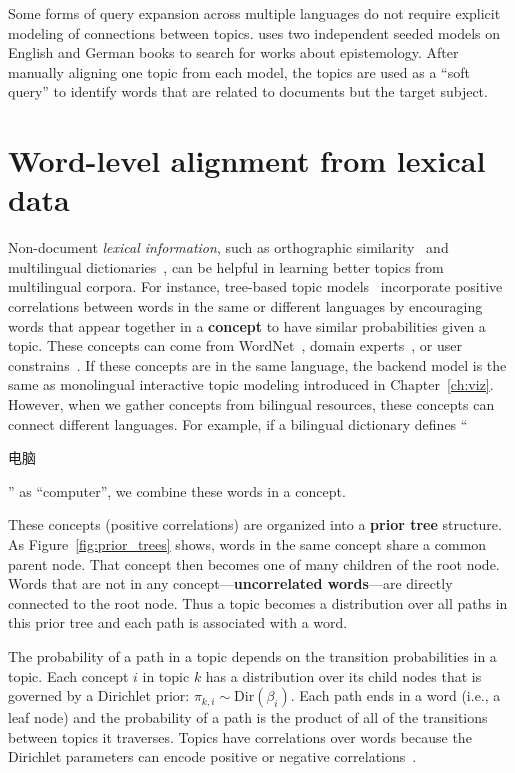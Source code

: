 Some forms of query expansion across multiple languages do not require explicit modeling of connections between topics.
\cite{erlin2017topic} uses two independent seeded models on English and German books to search for works about epistemology.
After manually aligning one topic from each model, the topics are used as a ``soft query'' to identify words that are related to documents but the target subject.

\section{Word-level alignment from lexical data}

Non-document \emph{lexical information}, such as orthographic
similarity~\citep{boyd-graber-09} and multilingual
dictionaries~\citep{boyd-graber-10}, can be helpful in learning
better topics from multilingual corpora. For instance, tree-based
topic models~\citep[\tlda{}]{boyd-graber-07,andrzejewski-09,hu-14:itm}
incorporate positive correlations between words in the same or
different languages by encouraging words that appear together in a
{\bf concept} to have similar probabilities given a topic. These
concepts can come from WordNet~\citep{boyd-graber-10}, domain
experts~\citep{andrzejewski-09}, or user
constrains~\citep{hu-14:itm}. If these concepts are in the same
language, the backend model is the same as monolingual interactive topic modeling
introduced in Chapter~\ref{ch:viz}. However, when we gather concepts
from bilingual resources, these concepts can connect different
languages. For example, if a bilingual dictionary defines
``\begin{CJK*}{UTF8}{gbsn}电脑\end{CJK*}'' as ``computer'', we combine
  these words in a concept.

These concepts (positive correlations) are organized into a {\bf prior
  tree} structure. As Figure~\ref{fig:prior_trees} shows, words in the
same concept share a common parent node. That concept then becomes
one of many children of the root node.  Words that are not in any
concept---{\bf uncorrelated words}---are directly connected to the
root node. Thus a topic becomes a distribution over all paths in this
prior tree and each path is associated with a word.

The probability of a path in a topic depends on the transition
probabilities in a topic.  Each concept $i$ in topic $k$ has a
distribution over its child nodes that is governed by a Dirichlet prior:
$\pi_{k,i} \sim \text{Dir}(\beta_{i})$.  Each path ends in a word
(i.e., a leaf node) and the probability of a path is the product of
all of the transitions between topics it traverses. Topics have
correlations over words because the Dirichlet parameters can encode
positive or negative correlations~\citep{andrzejewski-09}.

